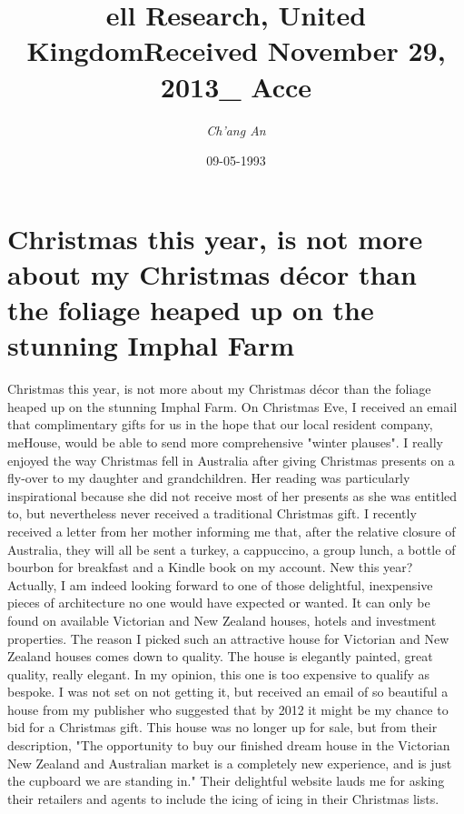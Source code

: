 \documentclass{article}%
\title{ell Research, United KingdomReceived November 29, 2013\_ Acce}%
\author{\textit{Ch'ang An}}%
\date{09-05-1993}%
\begin{document}
%
\normalsize%
\maketitle%
\section{Christmas this year, is not more about my Christmas décor than the foliage heaped up on the stunning Imphal Farm}%
\label{sec:Christmasthisyear,isnotmoreaboutmyChristmasdcorthanthefoliageheapeduponthestunningImphalFarm}%
Christmas this year, is not more about my Christmas décor than the foliage heaped up on the stunning Imphal Farm. On Christmas Eve, I received an email that complimentary gifts for us in the hope that our local resident company, meHouse, would be able to send more comprehensive "winter plauses".\newline%
I really enjoyed the way Christmas fell in Australia after giving Christmas presents on a fly{-}over to my daughter and grandchildren. Her reading was particularly inspirational because she did not receive most of her presents as she was entitled to, but nevertheless never received a traditional Christmas gift. I recently received a letter from her mother informing me that, after the relative closure of Australia, they will all be sent a turkey, a cappuccino, a group lunch, a bottle of bourbon for breakfast and a Kindle book on my account.\newline%
New this year? Actually, I am indeed looking forward to one of those delightful, inexpensive pieces of architecture no one would have expected or wanted. It can only be found on available Victorian and New Zealand houses, hotels and investment properties. The reason I picked such an attractive house for Victorian and New Zealand houses comes down to quality. The house is elegantly painted, great quality, really elegant. In my opinion, this one is too expensive to qualify as bespoke. I was not set on not getting it, but received an email of so beautiful a house from my publisher who suggested that by 2012 it might be my chance to bid for a Christmas gift.\newline%
This house was no longer up for sale, but from their description, "The opportunity to buy our finished dream house in the Victorian New Zealand and Australian market is a completely new experience, and is just the cupboard we are standing in."\newline%
Their delightful website lauds me for asking their retailers and agents to include the icing of icing in their Christmas lists.\newline%
\end{document}
